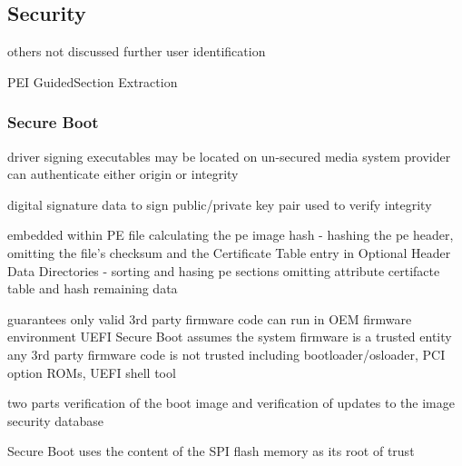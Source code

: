 
\subsection{Security}

others not discussed further
user identification

PEI
GuidedSection Extraction


\subsubsection{Secure Boot}

\cite{tianocore-understanding-uefi-secure-boot-chain}

driver signing
executables may be located on un-secured media
system provider can authenticate either origin or integrity

digital signature
data to sign
public/private key pair used to verify integrity


embedded within PE file
calculating the pe image hash
- hashing the pe header, omitting the file's checksum and the Certificate Table entry in Optional Header Data Directories
- sorting and hasing pe sections
omitting attribute certifacte table and hash remaining data

\cite{microsoft-pe-signature-format}




guarantees only valid 3rd party firmware code can run in OEM firmware environment
UEFI Secure Boot assumes the system firmware is a trusted entity
any 3rd party firmware code is not trusted
including bootloader/osloader, PCI option ROMs, UEFI shell tool

two parts
verification of the boot image and verification of updates to the image security database
\cite{tianocore-understanding-uefi-secure-boot-chain}

Secure Boot uses the content of the SPI flash memory as its root of trust\cite{lojax}


